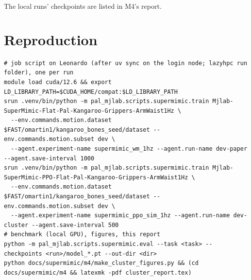 \documentclass[10pt]{article}
\begin{document}
The local runs' checkpoints are listed in M4's report.

\begin{table}[H]
\centering\small
\caption{The paper's benchmark (1296 \texttt{dev} clips) of SuperMimic's cluster checkpoints.}
\label{tab:all-sm}

\end{table}

\begin{table}[H]
\centering\small
\caption{The same for PPO-Sim's cluster checkpoints (every 1000 iterations and the last).}
\label{tab:all-ppo}

\end{table}

\section{Reproduction}

\begin{footnotesize}
\begin{verbatim}
# job script on Leonardo (after uv sync on the login node; lazyhpc run folder), one per run
module load cuda/12.6 && export LD_LIBRARY_PATH=$CUDA_HOME/compat:$LD_LIBRARY_PATH
srun .venv/bin/python -m pal_mjlab.scripts.supermimic.train Mjlab-SuperMimic-Flat-Pal-Kangaroo-Grippers-ArmWaist1Hz \
  --env.commands.motion.dataset $FAST/omartin1/kangaroo_bones_seed/dataset --env.commands.motion.subset dev \
  --agent.experiment-name supermimic_wm_1hz --agent.run-name dev-paper --agent.save-interval 1000
srun .venv/bin/python -m pal_mjlab.scripts.supermimic.train Mjlab-SuperMimic-PPO-Flat-Pal-Kangaroo-Grippers-ArmWaist1Hz \
  --env.commands.motion.dataset $FAST/omartin1/kangaroo_bones_seed/dataset --env.commands.motion.subset dev \
  --agent.experiment-name supermimic_ppo_sim_1hz --agent.run-name dev-cluster --agent.save-interval 500
# benchmark (local GPU), figures, this report
python -m pal_mjlab.scripts.supermimic.eval --task <task> --checkpoints <run>/model_*.pt --out-dir <dir>
python docs/supermimic/m4/make_cluster_figures.py && (cd docs/supermimic/m4 && latexmk -pdf cluster_report.tex)
\end{verbatim}
\end{footnotesize}
\end{document}
